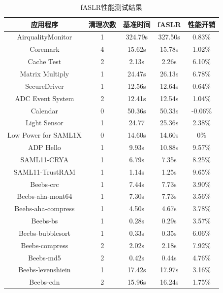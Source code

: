 \documentclass[12pt,a4paper]{ctexart}
\numberwithin{figure}{section}
\begin{document}
\begin{longtable}{ccccc}
    \caption{fASLR性能测试结果}  %
    \label{table1}                                            \\ %
    \hline
    应用程序                 & 清理次数 & 基准时间    & fASLR   & 性能开销    \\ \hline
    AirqualityMonitor    & 1    & 324.79s & 327.50s & 0.83\%  \\ 
    Coremark             & 4    & 15.62s  & 15.78s  & 1.02\%  \\ 
    Cache Test           & 2    & 2.13s   & 2.26s   & 6.10\%  \\ 
    Matrix Multiply      & 1    & 24.47s  & 26.13s  & 6.78\%  \\ 
    SecureDriver         & 1    & 12.56s  & 12.64s  & 0.64\%  \\ 
    ADC Event System     & 2    & 12.41s  & 12.54s  & 1.04\%  \\ 
    Calendar             & 0    & 50.36s  & 50.33s  & -0.06\% \\ 
    Light Sensor         & 1    & 24.77   & 25.36s  & 2.38\%  \\ 
    Low Power for SAML1X & 0    & 14.60s  & 14.60s  & 0\%     \\ 
    ADP Hello            & 1    & 9.93s   & 10.88s  & 9.57\%  \\ 
    SAML11-CRYA          & 1    & 6.79s   & 7.35s   & 8.25\%  \\ 
    SAML11-TrustRAM      & 1    & 1.14s   & 1.25s   & 9.65\%  \\ 
    Beebs-crc            & 1    & 7.44s   & 7.73s   & 3.90\%  \\ 
    Beebs-aha-mont64     & 1    & 7.30s   & 7.73s   & 3.56\%  \\ 
    Beebs-aha-compress   & 1    & 4.50s   & 4.67s   & 3.78\%  \\ 
    Beebs-bs             & 1    & 0.28s   & 0.29s   & 3.57\%  \\ 
    Beebs-bubblesort     & 1    & 0.33s   & 0.35s   & 6.06\%  \\ 
    Beebs-compress       & 2    & 2.02s   & 2.18s   & 7.92\%  \\ 
    Beebs-md5            & 2    & 0.42s   & 0.44s   & 4.76\%  \\ 
    Beebs-levenshiein    & 1    & 17.42s  & 17.97s  & 3.16\%  \\ 
    Beebs-edn            & 2    & 15.96s  & 16.24s  & 1.75\%  \\ \hline
\end{longtable}
\end{document}
